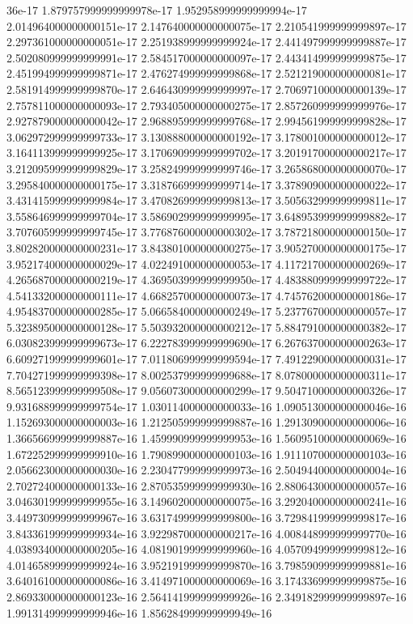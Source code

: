 36e-17	1.879757999999999978e-17	1.952958999999999994e-17	2.014964000000000151e-17	2.147640000000000075e-17	2.210541999999999897e-17	2.297361000000000051e-17	2.251938999999999924e-17	2.441497999999999887e-17	2.502080999999999991e-17	2.584517000000000097e-17	2.443414999999999875e-17	2.451994999999999871e-17	2.476274999999999868e-17	2.521219000000000081e-17	2.581914999999999870e-17	2.646430999999999997e-17	2.706971000000000139e-17	2.757811000000000093e-17	2.793405000000000275e-17	2.857260999999999976e-17	2.927879000000000042e-17	2.968895999999999768e-17	2.994561999999999828e-17	3.062972999999999733e-17	3.130888000000000192e-17	3.178001000000000012e-17	3.164113999999999925e-17	3.170690999999999702e-17	3.201917000000000217e-17	3.212095999999999829e-17	3.258249999999999746e-17	3.265868000000000070e-17	3.295840000000000175e-17	3.318766999999999714e-17	3.378909000000000022e-17	3.431415999999999984e-17	3.470826999999999813e-17	3.505632999999999811e-17	3.558646999999999704e-17	3.586902999999999995e-17	3.648953999999999882e-17	3.707605999999999745e-17	3.776876000000000302e-17	3.787218000000000150e-17	3.802820000000000231e-17	3.843801000000000275e-17	3.905270000000000175e-17	3.952174000000000029e-17	4.022491000000000053e-17	4.117217000000000269e-17	4.265687000000000219e-17	4.369503999999999950e-17	4.483880999999999722e-17	4.541332000000000111e-17	4.668257000000000073e-17	4.745762000000000186e-17	4.954837000000000285e-17	5.066584000000000249e-17	5.237767000000000057e-17	5.323895000000000128e-17	5.503932000000000212e-17	5.884791000000000382e-17	6.030823999999999673e-17	6.222783999999999690e-17	6.267637000000000263e-17	6.609271999999999601e-17	7.011806999999999594e-17	7.491229000000000031e-17	7.704271999999999398e-17	8.002537999999999688e-17	8.078000000000000311e-17	8.565123999999999508e-17	9.056073000000000299e-17	9.504710000000000326e-17	9.931688999999999754e-17	1.030114000000000033e-16	1.090513000000000046e-16	1.152693000000000003e-16	1.212505999999999887e-16	1.291309000000000006e-16	1.366566999999999887e-16	1.459990999999999953e-16	1.560951000000000069e-16	1.672252999999999910e-16	1.790899000000000103e-16	1.911107000000000103e-16	2.056623000000000030e-16	2.230477999999999973e-16	2.504944000000000004e-16	2.702724000000000133e-16	2.870535999999999930e-16	2.880643000000000057e-16	3.046301999999999955e-16	3.149602000000000075e-16	3.292040000000000241e-16	3.449730999999999967e-16	3.631749999999999800e-16	3.729841999999999817e-16	3.843361999999999934e-16	3.922987000000000217e-16	4.008448999999999770e-16	4.038934000000000205e-16	4.081901999999999960e-16	4.057094999999999812e-16	4.014658999999999924e-16	3.952191999999999870e-16	3.798590999999999881e-16	3.640161000000000086e-16	3.414971000000000069e-16	3.174336999999999875e-16	2.869330000000000123e-16	2.564141999999999926e-16	2.349182999999999897e-16	1.991314999999999946e-16	1.856284999999999949e-16

